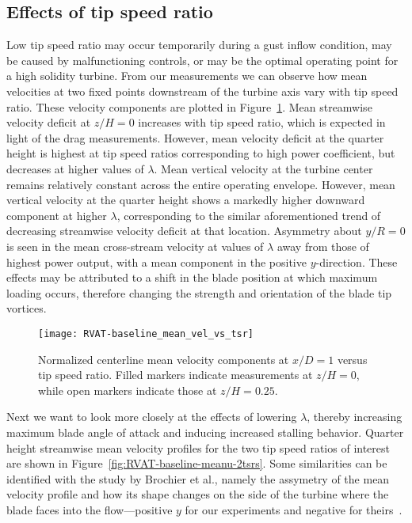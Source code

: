 \subsection{Effects of tip speed ratio}

Low tip speed ratio may occur temporarily during a gust inflow condition, may be
caused by malfunctioning controls, or may be the optimal operating point for a
high solidity turbine. From our measurements we can observe how mean velocities
at two fixed points downstream of the turbine axis vary with tip speed ratio.
These velocity components are plotted in
Figure~\ref{fig:RVAT-baseline-mean-vel-vs-tsr}. Mean streamwise velocity deficit
at $z/H = 0$ increases with tip speed ratio, which is expected in light of the
drag measurements. However, mean velocity deficit at the quarter height is
highest at tip speed ratios corresponding to high power coefficient, but
decreases at higher values of $\lambda$. Mean vertical velocity at the turbine
center remains relatively constant across the entire operating envelope.
However, mean vertical velocity at the quarter height shows a markedly higher
downward component at higher $\lambda$, corresponding to the similar
aforementioned trend of decreasing streamwise velocity deficit at that location.
Asymmetry about $y/R=0$ is seen in the mean cross-stream velocity at values of
$\lambda$ away from those of highest power output, with a mean component in the
positive $y$-direction. These effects may be attributed to a shift in the blade
position at which maximum loading occurs, therefore changing the strength and
orientation of the blade tip vortices.

\begin{figure}
    \centering
    
    \texttt{[image: RVAT-baseline\_mean\_vel\_vs\_tsr]}

    \caption{Normalized centerline mean velocity components at $x/D=1$ versus
        tip speed ratio. Filled markers indicate measurements at $z/H=0$, while open
        markers indicate those at $z/H=0.25$.}

    \label{fig:RVAT-baseline-mean-vel-vs-tsr} 
\end{figure}

Next we want to look more closely at the effects of lowering $\lambda$, thereby
increasing maximum blade angle of attack and inducing increased stalling
behavior. Quarter height streamwise mean velocity profiles for the two tip speed
ratios of interest are shown in Figure~\ref{fig:RVAT-baseline-meanu-2tsrs}. Some
similarities can be identified with the study by Brochier et al., namely the
assymetry of the mean velocity profile and how its shape changes on the side of
the turbine where the blade faces into the flow---positive $y$ for our
experiments and negative for theirs~\cite{Brochier1986}.

